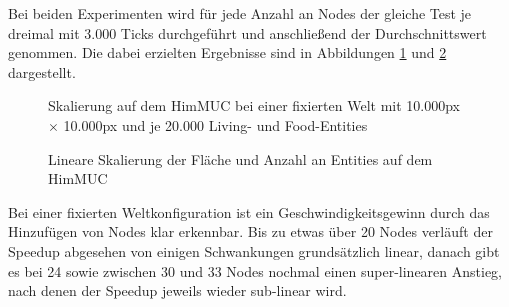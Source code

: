 \documentclass[course=erap]{aspdoc}
\begin{document}
Bei beiden Experimenten wird für jede Anzahl an Nodes der gleiche Test je dreimal mit 3.000 Ticks durchgeführt und anschließend der Durchschnittswert genommen. Die dabei erzielten Ergebnisse sind in Abbildungen \ref{fig:himmuc-strong-scaling} und \ref{fig:himmuc-weak-scaling} dargestellt.

\begin{figure}[h]
\centering
{}
\caption{Skalierung auf dem HimMUC bei einer fixierten Welt mit 10.000px $\times$ 10.000px und je 20.000 Living- und Food-Entities}
\label{fig:himmuc-strong-scaling}
\end{figure}

\begin{figure}
\centering
\begin{minipage}{.5\textwidth}
\centering
{}
\end{minipage}%
\begin{minipage}{.5\textwidth}
\centering
{}
\end{minipage}
\caption{Lineare Skalierung der Fläche und Anzahl an Entities auf dem HimMUC}
\label{fig:himmuc-weak-scaling}
\end{figure}

Bei einer fixierten Weltkonfiguration ist ein Geschwindigkeitsgewinn durch das Hinzufügen von Nodes klar erkennbar. Bis zu etwas über 20 Nodes verläuft der Speedup abgesehen von einigen Schwankungen grundsätzlich linear, danach gibt es bei 24 sowie zwischen 30 und 33 Nodes nochmal einen super-linearen Anstieg, nach denen der Speedup jeweils wieder sub-linear wird.
\end{document}
